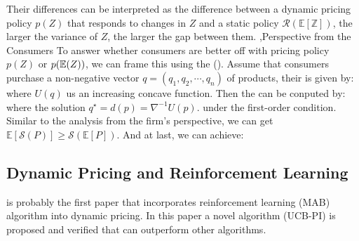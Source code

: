 \documentclass[12pt]{report}
\begin{document}
Their differences can be interpreted as the difference between a dynamic pricing policy $p(Z)$ that responds to changes in $Z$ and a static policy $\mathcal{R}(\mathbb{E}[\mathbb{Z}])$,
the larger the variance of $Z$, the larger the gap between them.
\sep{Perspective from the Consumers}
To answer whether consumers are better off with pricing policy $p(Z)$ or $p(\mathbb{E}(Z))$,
we can frame this using the  (\cite{chen2019welfare}).
Assume that consumers purchase a non-negative vector $q=(q_1,q_2,\cdots,q_n)$ of products, their  is given by:
where $U(q)$ us an increasing concave function. Then the  can be conputed by:
where the solution $q^{\star}=d(p)=\nabla^{-1}U(p)$. under the first-order condition. Similar to the analysis from the firm's
perspective, we can get $\mathbb{E}[\mathcal{S}(P)]\geq\mathcal{S}(\mathbb{E}[P])$.
And at last, we can achieve:

\subsection{Dynamic Pricing and Reinforcement Learning}

\cite{misra2019dynamic} is probably the first paper that incorporates reinforcement learning (MAB) algorithm
into dynamic pricing.
In this paper a novel algorithm (UCB-PI) is proposed and verified that can outperform other algorithms.\\
\end{document}

